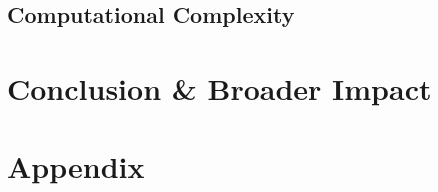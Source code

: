 

\subsection{Computational Complexity}

\lipsum[1]

\section{Conclusion \& Broader Impact}

\lipsum[1]

% 




\section*{Appendix}
\appendix



